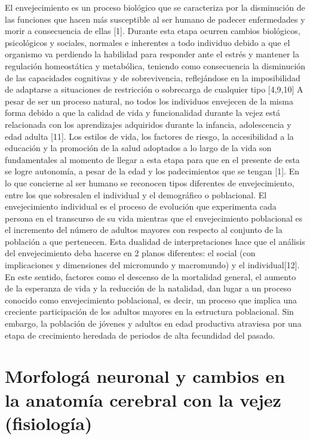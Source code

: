 	El envejecimiento es un proceso biológico que se caracteriza por la disminución de las funciones que hacen más susceptible al ser humano de padecer enfermedades y morir a consecuencia de ellas [1]. Durante esta etapa ocurren cambios biológicos, psicológicos y sociales, normales e inherentes a todo individuo debido a que el organismo va perdiendo la habilidad para responder ante el estrés y mantener la regulación homeostática y metabólica, teniendo como consecuencia la disminución de las capacidades cognitivas y de sobrevivencia, reflejándose en la imposibilidad de adaptarse a situaciones de restricción o sobrecarga de cualquier tipo [4,9,10]
	A pesar de ser un proceso natural, no todos los individuos envejecen de la misma forma debido a que la calidad de vida y funcionalidad durante la vejez está relacionada con los aprendizajes adquiridos durante la infancia, adolescencia y edad adulta [11]. Los estilos de vida, los factores de riesgo, la accesibilidad a la educación y la promoción de la salud adoptados a lo largo de la vida son fundamentales al momento de llegar a esta etapa para que en el presente de esta se logre autonomía, a pesar de la edad y los padecimientos que se tengan [1].
	En lo que concierne al ser humano se reconocen tipos diferentes de envejecimiento, entre los que sobresalen el individual y el demográfico o poblacional. El envejecimiento individual es el proceso de evolución que experimenta cada persona en el transcurso de su vida mientras que el envejecimiento poblacional es el incremento del número de adultos mayores con respecto al conjunto de la población a que pertenecen. Esta dualidad de interpretaciones hace que el análisis del envejecimiento deba hacerse en 2 planos diferentes: el social (con implicaciones y dimensiones del micromundo y macromundo) y el individual[12].
	En este sentido, factores como el descenso de la mortalidad general, el aumento de la esperanza de vida y la reducción de la natalidad, dan lugar a un proceso conocido como envejecimiento poblacional, es decir, un proceso que implica una creciente participación de los adultos mayores en la estructura poblacional. Sin embargo, la población de jóvenes y adultos en edad productiva atraviesa por una etapa de crecimiento heredada de periodos de alta fecundidad del pasado.


\section{Morfolog\'a neuronal y cambios en la anatomía cerebral con la vejez (fisiolog\'ia)}

